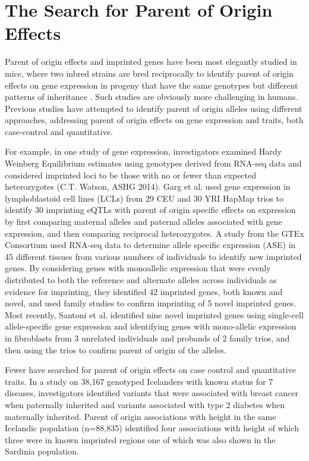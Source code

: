 \section{The Search for Parent of Origin Effects}


Parent of origin effects and imprinted genes have been most elegantly studied in mice, where two inbred strains are bred reciprocally to identify parent of origin effects on gene expression in progeny that have the same genotypes but different patterns of inheritance\cite{Babak2012} . Such studies are obviously more challenging in humans. Previous studies have attempted to identify parent of origin alleles using different approaches, addressing parent of origin effects on gene expression and traits, both case-control and quantitative.

For example, in one study of gene expression, investigators examined Hardy Weinberg Equilibrium estimates using genotypes derived from RNA-seq data and considered imprinted loci to be those with no or fewer than expected heterozygotes (C.T. Watson, ASHG 2014). Garg et al. used gene expression in lymphoblastoid cell lines (LCLs) from 29 CEU and 30 YRI HapMap trios to identify 30 imprinting eQTLs with parent of origin specific effects on expression by first comparing maternal alleles and paternal alleles associated with gene expression, and then comparing reciprocal heterozygotes\cite{Garg2012a}. A study from the GTEx Consortium used RNA-seq data to determine allele specific expression (ASE) in 45 different tissues from various numbers of individuals to identify new imprinted genes\cite{Baran:2015cx}. By considering genes with monoallelic expression that were evenly distributed to both the reference and alternate alleles across individuals as evidence for imprinting, they identified 42 imprinted genes, both known and novel, and used family studies to confirm imprinting of 5 novel imprinted genes. Most recently, Santoni et al. identified nine novel imprinted genes using single-cell allele-specific gene expression and identifying genes with mono-allelic expression in fibroblasts from 3 unrelated individuals and probands of 2 family trios, and then using the trios to confirm parent of origin of the alleles\cite{Santoni:2017hu}.

Fewer have searched for parent of origin effects on case control and quantitative traits. In a study on 38,167 genotyped Icelanders with known status for 7 diseases, investigators identified variants that were associated with breast cancer when paternally inherited and variants associated with type 2 diabetes when maternally inherited\cite{Kong:2009kk}. Parent of origin associations with height in the same Icelandic population (n=88,835) identified four associations with height of which three were in known imprinted regions one of which was also shown in the Sardinia population\cite{Zoledziewska:2015do}.

